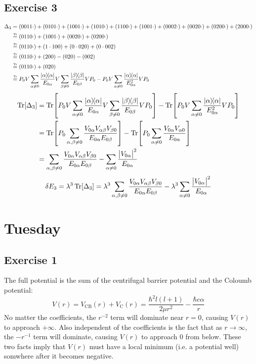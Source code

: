 \documentclass[12pt]{article}
\newcommand{\magsq}[1]{\big|#1\big|^2}
\newcommand\treq{\stackrel{\mathclap{\tiny\mbox{Tr}}}{=}}
\begin{document}
\subsection*{Exercise 3}
\begin{align*}
    \Delta_3 &= (0011\cdot) + (0101\cdot) + (1001\cdot) + (1010\cdot) + (1100\cdot) + (1001\cdot) + (0002\cdot) + (0020\cdot) + (0200\cdot) + (2000\cdot) \\
    &\treq  (0110\cdot) + (1001\cdot) + (0020\cdot) + (0200\cdot) \\
    &\treq (0110\cdot) + (1\cdot 100) + (0\cdot020) + (0\cdot 002) \\
    &\treq (0110\cdot) + (200) - (020) - (002) \\
    &\treq (0110\cdot) + (020) \\
    &\treq P_0V\sum_{\alpha\neq 0}\frac{\dyad{\alpha}}{E_{0\alpha}}V\sum_{\beta\neq 0}\frac{\dyad{\beta}}{E_{0\beta}}VP_0 - P_0V\sum_{\alpha\neq 0}\frac{\dyad{\alpha}}{E_{0\alpha}^2}VP_0
\end{align*}
\begin{align*}
    \Tr[\Delta_3] &= \Tr[P_0V\sum_{\alpha\neq 0}\frac{\dyad{\alpha}}{E_{0\alpha}}V\sum_{\beta\neq 0}\frac{\dyad{\beta}}{E_{0\beta}}VP_0] - \Tr[P_0V\sum_{\alpha\neq 0}\frac{\dyad{\alpha}}{E_{0\alpha}^2}VP_0] \\
    &= \Tr[P_0\sum_{\alpha , \beta\neq 0}\frac{V_{0\alpha}V_{\alpha\beta}V_{\beta 0}}{E_{0\alpha}E_{0\beta}}] - \Tr[P_0\sum_{\alpha\neq 0}\frac{V_{0\alpha}V_{\alpha 0}}{E_{0\alpha}}] \\
    &= \sum_{\alpha , \beta\neq 0}\frac{V_{0\alpha}V_{\alpha\beta}V_{\beta 0}}{E_{0\alpha}E_{0\beta}} - \sum_{\alpha\neq 0}\frac{\magsq{V_{0\alpha}}}{E_{0\alpha}}
\end{align*}
\[ \delta E_3 = \lambda^3\Tr[\Delta_3] = \lambda^3\sum_{\alpha , \beta\neq 0}\frac{V_{0\alpha}V_{\alpha\beta}V_{\beta 0}}{E_{0\alpha}E_{0\beta}} - \lambda^3\sum_{\alpha\neq 0}\frac{\magsq{V_{0\alpha}}}{E_{0\alpha}} \]


\section*{Tuesday}
\subsection*{Exercise 1}
The full potential is the sum of the centrifugal barrier potential and the Coloumb potential:
\[ V(r) = V_\text{CB}(r) + V_\text{C}(r) = \frac{\hbar^2l(l+1)}{2\mu r^2} - \frac{\hbar c \alpha}{r} \]
No matter the coefficients, the $r^{-2}$ term will dominate near $r=0$, causing $V(r)$ to approach $+\infty$. Also independent of the coefficients is the fact that as $r\to\infty$, the $-r^{-1}$ term will dominate, causing $V(r)$ to approach 0 from below. These two facts imply that $V(r)$ must have a local minimum (i.e. a potential well) somwhere after it becomes negative.
\end{document}
